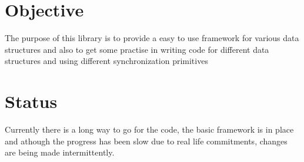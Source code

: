 \hypertarget{index_Objective}{}\section{Objective}\label{index_Objective}
The purpose of this library is to provide a easy to use framework for various data structures and also to get some practise in writing code for different data structures and using different synchronization primitives \hypertarget{index_Status}{}\section{Status}\label{index_Status}
Currently there is a long way to go for the code, the basic framework is in place and athough the progress has been slow due to real life commitments, changes are being made intermittently. 